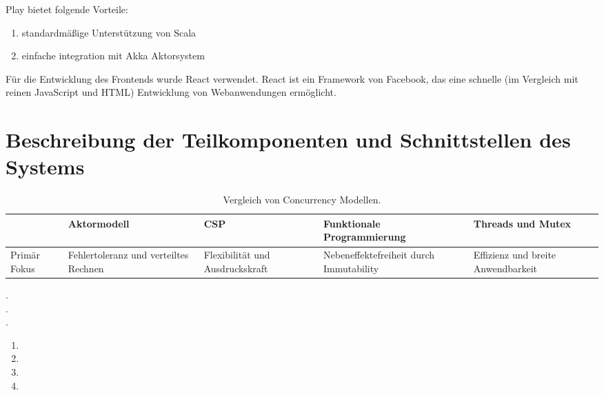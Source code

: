 Play bietet folgende Vorteile:

\begin{enumerate}
	\item standardmäßige Unterstützung von Scala
	
	\item einfache integration mit Akka Aktorsystem
\end{enumerate}

Für die Entwicklung des Frontends wurde React verwendet. React ist ein Framework von Facebook, das eine schnelle (im Vergleich mit reinen JavaScript und HTML) Entwicklung von Webanwendungen ermöglicht.

\section{Beschreibung der Teilkomponenten und Schnittstellen des Systems}











\textit{}

\begin{table} \centering
	\begin{tabular}{|P{3cm}|P{3cm}|P{3cm}|P{3cm}|P{3cm}|} 
		\hline
		&  \textbf{Aktormodell} & \textbf{CSP} & \textbf{Funktionale Programmierung} & \textbf{Threads und Mutex}\\
		
		\hline
		Primär Fokus & Fehlertoleranz und verteiltes Rechnen & Flexibilität und Ausdruckskraft & Nebeneffektefreiheit durch Immutability & Effizienz und breite Anwendbarkeit\\
		
		\hline
	\end{tabular}
	\caption{Vergleich von Concurrency Modellen.}
	\label{tab:123}
\end{table}

\begin{description} 
	\item[.] 
	
	\item[.] 
	
	\item[.] 
\end{description}

\begin{enumerate}
	\item 
	
	\item 
	
	\item 
	
	\item 
\end{enumerate}